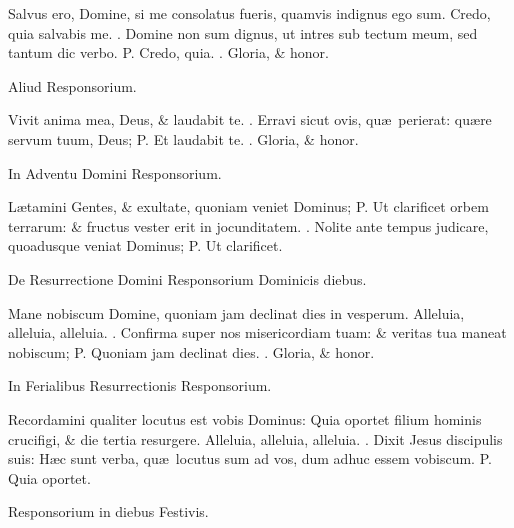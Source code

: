 \documentclass[letter,11pt]{book}
\makeatletter
\DeclareRobustCommand{\Vbar}{\vers@resp{-0.1em}{V}}
\newcommand{\vers@resp@sym}{\raisebox{0.2ex}{\rotatebox[origin=c]{-20}{$\m@th\rceil$}}}
\newcommand{\vers@resp}[2]{%
  {\ooalign{\hidewidth\kern#1\vers@resp@sym\hidewidth\cr#2\cr}}%
}%
\def\P{\color{Red} P. \color{black}}
\def\V{\color{Red} \Vbar . \color{black}}
\makeatother
\begin{document}
\begin{multicols*}{2}
\par \noindent Salvus ero, Domine, si me consolatus fueris, quamvis indignus ego sum. Credo, quia salvabis me. \V Domine non sum dignus, ut intres sub tectum meum, sed tantum dic verbo. \P Credo, quia. \V Gloria, \& honor.
\vspace{-.5em} \begin{center} \color{Red} Aliud Responsorium. \end{center} \vspace{-.5em}
\par \noindent Vivit anima mea, Deus, \& laudabit te. \V Erravi sicut ovis, qu\ae \ perierat: qu\ae re servum tuum, Deus; \P Et laudabit te. \V Gloria, \& honor.
\vspace{-.5em} \begin{center} \color{Red} In Adventu Domini Responsorium. \end{center} \vspace{-.5em}
\par \noindent L\ae tamini Gentes, \& exultate, quoniam veniet Dominus; \P Ut clarificet orbem terrarum: \& fructus vester erit in jocunditatem. \V Nolite ante tempus judicare, quoadusque veniat Dominus; \P Ut clarificet.
\vspace{-.5em} \begin{center} \color{Red} De Resurrectione Domini Responsorium Dominicis diebus. \end{center} \vspace{-.5em}
\par \noindent Mane nobiscum Domine, quoniam jam declinat dies in vesperum. Alleluia, alleluia, alleluia. \V Confirma super nos misericordiam tuam: \& veritas tua maneat nobiscum; \P Quoniam jam declinat dies. \V Gloria, \& honor.
\vspace{-.5em} \begin{center} \color{Red} In Ferialibus Resurrectionis Responsorium. \end{center} \vspace{-.5em}
\par \noindent Recordamini qualiter locutus est vobis Dominus: Quia oportet filium hominis crucifigi, \& die tertia resurgere. Alleluia, alleluia, alleluia. \V Dixit Jesus discipulis suis: H\ae c sunt verba, qu\ae \ locutus sum ad vos, dum adhuc
essem vobiscum. \P Quia oportet.
\vspace{-.5em} \begin{center} \color{Red} Responsorium in diebus Festivis. \end{center} \vspace{-.5em}

\end{multicols*}
\end{document}
